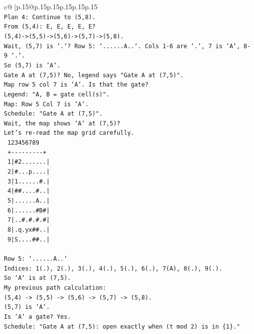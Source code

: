 \documentclass{article}
\begin{document}
{\begin{supertabular}{c@{$\;$}|p{.15\linewidth}@{}p{.15\linewidth}p{.15\linewidth}p{.15\linewidth}p{.15\linewidth}p{.15\linewidth}}
{{{\\ 
\texttt{Plan 4: Continue to (5,8).} \\
\texttt{From (5,4): E, E, E, E, E?} \\
\texttt{(5,4){-}>(5,5){-}>(5,6){-}>(5,7){-}>(5,8).} \\
\texttt{Wait, (5,7) is `.`? Row 5: `......A..`. Cols 1{-}6 are `.`, 7 is `A`, 8{-}9 `.`.} \\
\texttt{So (5,7) is `A`.} \\
\texttt{Gate A at (7,5)? No, legend says "Gate A at (7,5)".} \\
\texttt{Map row 5 col 7 is `A`. Is that the gate?} \\
\texttt{Legend: "A, B = gate cell(s)".} \\
\texttt{Map: Row 5 Col 7 is `A`.} \\
\texttt{Schedule: "Gate A at (7,5)".} \\
\texttt{Wait, the map shows `A` at (7,5)?} \\
\texttt{Let's re{-}read the map grid carefully.} \\
\texttt{   123456789} \\
\texttt{  +{-}{-}{-}{-}{-}{-}{-}{-}{-}+} \\
\texttt{ 1|\#2.......|} \\
\texttt{ 2|\#...p....|} \\
\texttt{ 3|1......\#.|} \\
\texttt{ 4|\#\#....\#..|} \\
\texttt{ 5|......A..|} \\
\texttt{ 6|......\#B\#|} \\
\texttt{ 7|..\#.\#.\#.\#|} \\
\texttt{ 8|.q.yx\#\#..|} \\
\texttt{ 9|S....\#\#..|} \\
\\ 
\texttt{Row 5: `......A..`} \\
\texttt{Indices: 1(.), 2(.), 3(.), 4(.), 5(.), 6(.), 7(A), 8(.), 9(.).} \\
\texttt{So `A` is at (7,5).} \\
\texttt{My previous path calculation:} \\
\texttt{(5,4) {-}> (5,5) {-}> (5,6) {-}> (5,7) {-}> (5,8).} \\
\texttt{(5,7) is `A`.} \\
\texttt{Is `A` a gate? Yes.} \\
\texttt{Schedule: "Gate A at (7,5): open exactly when (t mod 2) is in \{1\}."} \\
}}}
\end{supertabular}}
\end{document}
